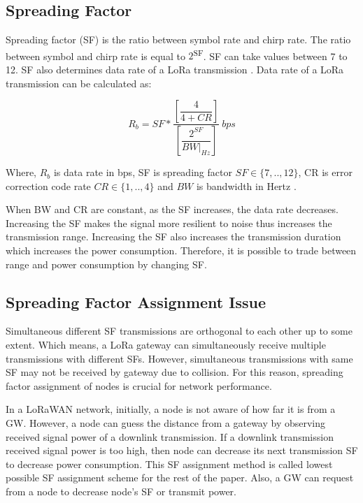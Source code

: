\documentclass[conference]{IEEEtran}
\begin{document}
\subsection{Spreading Factor}
\par Spreading factor (SF) is the ratio between symbol rate and chirp rate. The ratio between symbol and chirp rate is equal to $2$\textsuperscript{SF}. SF can take values between 7 to 12. SF also determines data rate of a LoRa transmission \cite{AN1200.22}. Data rate of a LoRa transmission can be calculated as:

\begin{equation} \label{eq:bit_rate_sf}
R_{b} = SF * \dfrac{\left[ \dfrac{4}{4+CR} \right] }{ \left[ \dfrac{2^{SF}}{BW|_{Hz}} \right]} \ bps
\end{equation}

Where, $R_{b}$ is data rate in bps, SF is spreading factor $SF \in \{7,..,12\}$, CR is error correction code rate $CR \in \{1,..,4\}$ and $BW$ is bandwidth in Hertz \cite{AN1200.22}.

\par When BW and CR are constant, as the SF increases, the data rate decreases. Increasing the SF makes the signal more resilient to noise thus increases the transmission range. Increasing the SF also increases the transmission duration which increases the power consumption. Therefore, it is possible to trade between range and power consumption by changing SF.

\subsection{Spreading Factor Assignment Issue}
\par Simultaneous different SF transmissions are orthogonal to each other up to some extent. Which means, a LoRa gateway can simultaneously receive multiple transmissions with different SFs. However, simultaneous transmissions with same SF may not be received by gateway due to collision. For this reason, spreading factor assignment of nodes is crucial for network performance.

\par In a LoRaWAN network, initially, a node is not aware of how far it is from a GW. However, a node can guess the distance from a gateway by observing received signal power of a downlink transmission. If a downlink transmission received signal power is too high, then node can decrease its next transmission SF to decrease power consumption. This SF assignment method is called lowest possible SF assignment scheme for the rest of the paper. Also, a GW can request from a node to decrease node's SF or transmit power.
\end{document}

